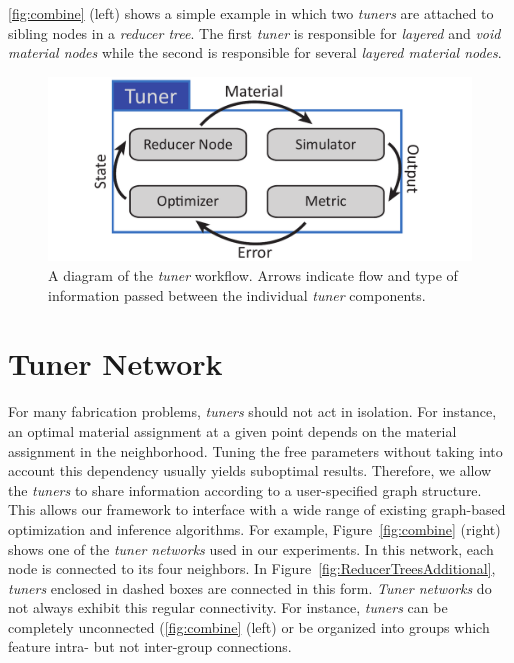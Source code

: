 \autoref{fig:combine} (left) shows a simple example in which two \emph{tuners} are attached to sibling nodes in a \emph{reducer tree}. The first \emph{tuner} is responsible for \emph{layered} and \emph{void material nodes }while the second is responsible for several \emph{layered material nodes}.  

\begin{figure}
\includegraphics[width=0.7\linewidth]{figure/tuner2.pdf}
\caption{A diagram of the \emph{tuner} workflow. Arrows indicate flow and type of information passed between the individual \emph{tuner} components.}
\label{fig:tuner0}
\end{figure}

\section{Tuner Network}
\label{sec:TunerNetwork}
For many fabrication problems, \emph{tuners} should not act in isolation. For instance, an optimal material assignment at a given point depends on the material assignment in the neighborhood. Tuning the free parameters without taking into account this dependency usually yields suboptimal results. Therefore, we allow the \emph{tuners} to share information according to a user-specified graph structure. This allows our framework to interface with a wide range of existing graph-based optimization and inference algorithms. For example, Figure~\ref{fig:combine} (right) shows one of the \emph{tuner networks} used in our experiments.
In this network, each node is connected to its four neighbors. In Figure~\ref{fig:ReducerTreesAdditional}, \emph{tuners} enclosed in dashed boxes are connected in this form. \emph{Tuner networks} do not always exhibit this regular connectivity. For instance, \emph{tuners} can be completely unconnected (\autoref{fig:combine} (left) or be organized into groups which feature intra- but not inter-group connections.

